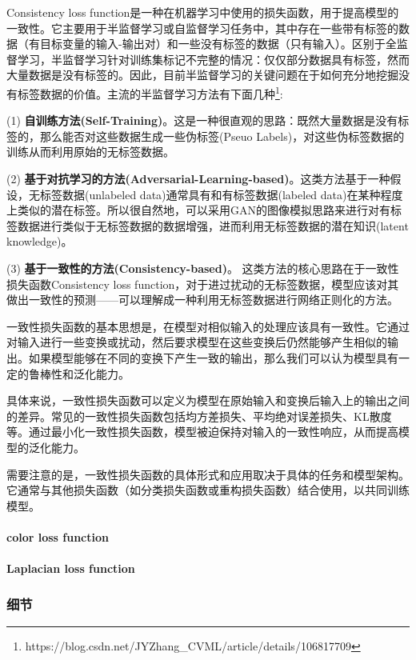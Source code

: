 \documentclass[letterpaper,12pt]{article}
\begin{document}
	Consistency loss function是一种在机器学习中使用的损失函数，用于提高模型的一致性。它主要用于半监督学习或自监督学习任务中，其中存在一些带有标签的数据（有目标变量的输入-输出对）和一些没有标签的数据（只有输入）。区别于全监督学习，半监督学习针对训练集标记不完整的情况：仅仅部分数据具有标签，然而大量数据是没有标签的。因此，目前半监督学习的关键问题在于如何充分地挖掘没有标签数据的价值。主流的半监督学习方法有下面几种\footnote{https://blog.csdn.net/JYZhang\_CVML/article/details/106817709}:
	
	(1) \textbf{自训练方法(Self-Training)}。这是一种很直观的思路：既然大量数据是没有标签的，那么能否对这些数据生成一些伪标签(Pseuo Labels)，对这些伪标签数据的训练从而利用原始的无标签数据。
	
	(2) \textbf{基于对抗学习的方法(Adversarial-Learning-based)}。这类方法基于一种假设，无标签数据(unlabeled data)通常具有和有标签数据(labeled data)在某种程度上类似的潜在标签。所以很自然地，可以采用GAN的图像模拟思路来进行对有标签数据进行类似于无标签数据的数据增强，进而利用无标签数据的潜在知识(latent knowledge)。
	
	(3) \textbf{基于一致性的方法(Consistency-based)}。 这类方法的核心思路在于一致性损失函数Consistency loss function，对于进过扰动的无标签数据，模型应该对其做出一致性的预测——可以理解成一种利用无标签数据进行网络正则化的方法。
	
	一致性损失函数的基本思想是，在模型对相似输入的处理应该具有一致性。它通过对输入进行一些变换或扰动，然后要求模型在这些变换后仍然能够产生相似的输出。如果模型能够在不同的变换下产生一致的输出，那么我们可以认为模型具有一定的鲁棒性和泛化能力。
	
	具体来说，一致性损失函数可以定义为模型在原始输入和变换后输入上的输出之间的差异。常见的一致性损失函数包括均方差损失、平均绝对误差损失、KL散度等。通过最小化一致性损失函数，模型被迫保持对输入的一致性响应，从而提高模型的泛化能力。
	
	需要注意的是，一致性损失函数的具体形式和应用取决于具体的任务和模型架构。它通常与其他损失函数（如分类损失函数或重构损失函数）结合使用，以共同训练模型。
	
	\paragraph{color loss function}
	
	\paragraph{Laplacian loss function}
	
	\subsubsection{细节}
	
\end{document}
